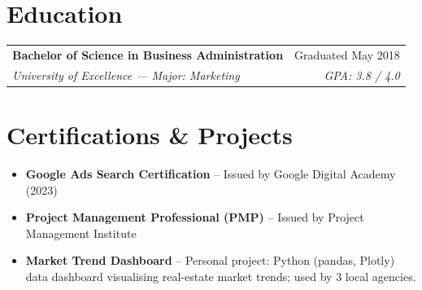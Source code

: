 \documentclass[10pt, letterpaper]{article}
\begin{document}

\section{Education}

\vspace{2pt}
\noindent
\begin{tabularx}{\linewidth}{@{} X r @{}}
  \textbf{Bachelor of Science in Business Administration} & \textcolor{cvgray}{Graduated May 2018} \\
  \textit{\textcolor{cvgray}{University of Excellence — Major: Marketing}} & \textit{\textcolor{cvgray}{GPA: 3.8 / 4.0}}
\end{tabularx}


\section{Certifications \& Projects}

\begin{itemize}
  \item \textbf{Google Ads Search Certification} -- Issued by Google Digital Academy (2023)
  \item \textbf{Project Management Professional (PMP)} -- Issued by Project Management Institute
  \item \textbf{Market Trend Dashboard} -- Personal project: Python (pandas, Plotly) data dashboard visualising real-estate market trends; used by 3 local agencies.
\end{itemize}
\end{document}
